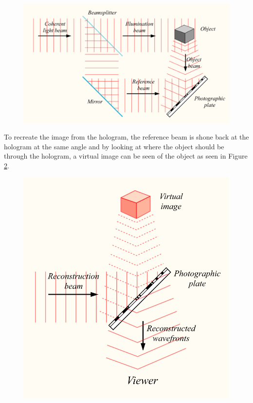 \documentclass[ aip, 12pt]{revtex4-1} %
\begin{document}
\begin{figure}[H]
\centerline{\includegraphics[scale=.45]{create.png}}
\caption{ }
\label{create}
\end{figure} 

To recreate the image from the hologram, the reference beam is shone back at the hologram at the same angle and by looking at where the object should be through the hologram, a virtual image can be seen of the object as seen in Figure \ref{reconstruct}.

\begin{figure}[H]
\centerline{\includegraphics[scale=.45]{reconstruct.png}}
\caption{ }
\label{reconstruct}
\end{figure} 
\end{document}
